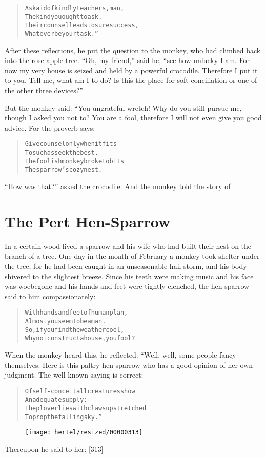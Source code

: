 \documentclass[article, twoside, 10pt]{memoir}
\renewenvironment{verbatim}{%
\begin{quote}%
\vskip -10pt%
\begin{alltt}\normalfont\small}{\end{alltt}%
\end{quote}%
\vskip -10pt
} %
\begin{document}
\begin{verbatim}
Ask aid of kindly teachers, man,
    The kind you ought to ask.
Their counsel leads to sure success,
    Whatever be your task.”
\end{verbatim}
After these reflections, he put the question to the monkey, who had
climbed back into the rose-apple tree. ``Oh, my friend,'' said he,
``see how unlucky I am. For now my very house is seized and held by a powerful crocodile. Therefore I put it to you. Tell me, what am I to do? Is this the place for soft conciliation or one of the other three devices?''

But the monkey said: “You ungrateful wretch! Why do you still
pursue me, though I asked you not to? You are a fool, therefore I
will not even give you good advice. For the proverb says:

\begin{verbatim}
Give counsel only when it fits
    To such as seek the best.
The foolish monkey broke to bits
    The sparrow's cozy nest.
\end{verbatim}
``How was that?'' asked the crocodile. And the monkey told the
story of

\chapter{The Pert Hen-Sparrow}

In a certain wood lived a sparrow and his wife who had built their
nest on the branch of a tree. One day in the month of February a
monkey took shelter under the tree; for he had been caught in an
unseasonable hail-storm, and his body shivered to the slightest
breeze. Since his teeth were making music and his face was
woebegone and his hands and feet were tightly clenched, the
hen-sparrow said to him compassionately:

\begin{verbatim}
With hands and feet of human plan,
Almost you seem to be a man.
So, if you find the weather cool,
Why not construct a house, you fool?
\end{verbatim}
When the monkey heard this, he reflected: “Well, well, some people
fancy themselves. Here is this paltry hen-sparrow who has a good
opinion of her own judgment. The well-known saying is correct:

\begin{verbatim}
Of self-conceit all creatures show
    An adequate supply:
The plover lies with claws upstretched
    To prop the falling sky.”
\end{verbatim}
\begin{figure}[p]\texttt{[image: hertel/resized/00000313]}\end{figure}Thereupon he said to her: [313]
\end{document}
